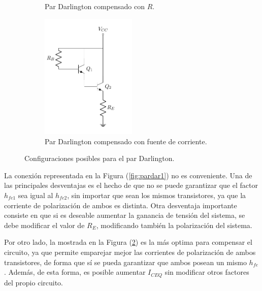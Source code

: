 \begin{figure}[H]
\begin{subfigure}{.4\textwidth}
	\caption{Par Darlington compensado con $R$.}
	\label{fig:pardar2}
\end{subfigure}
\begin{subfigure}{.5\textwidth}
\centering
	\includegraphics[width=0.5\textwidth, page=3]{Imagenes/ParDarlington.pdf}
	\caption{Par Darlington compensado con fuente de corriente.}
	\label{fig:pardar3}
\end{subfigure}
\caption{Configuraciones posibles para el par Darlington.}
\label{fig:pardar}
\end{figure}

La conexión representada en la Figura (\ref{fig:pardar1}) no es conveniente. Una de las principales desventajas es el hecho de que no se puede garantizar que el factor $h_{fe1}$ sea igual al $h_{fe2}$, sin importar que sean los mismos transistores, ya que la corriente de polarización de ambos es distinta. Otra desventaja importante consiste en que si es deseable aumentar la ganancia de tensión del sistema, se debe modificar el valor de $R_E$, modificando también la polarización del sistema.


Por otro lado, la mostrada en la Figura (\ref{fig:pardar3}) es la más optima para compensar el circuito, ya que permite emparejar mejor las corrientes de polarización de ambos transistores, de forma que sí se pueda garantizar que ambos posean un mismo $h_{fe}$. Además, de esta forma, es posible aumentar $I_{CEQ}$ sin modificar otros factores del propio circuito.

